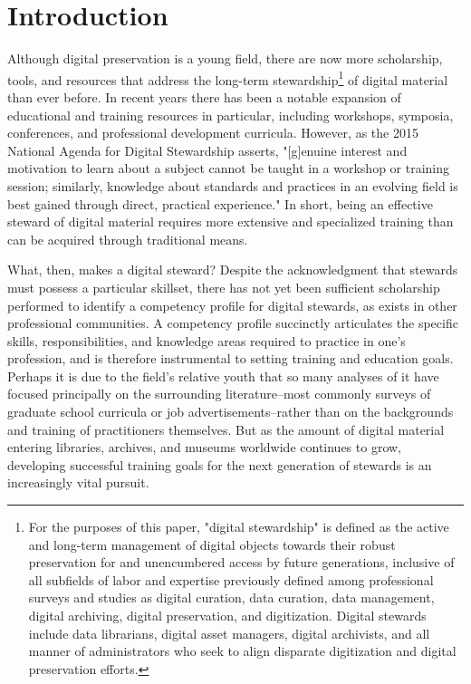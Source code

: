 \documentclass{acm_proc_article-sp}
\begin{document}
\section{Introduction}
Although digital preservation is a young field, there are now more scholarship, tools, and resources that address the long-term stewardship\footnote{For the purposes of this paper, "digital stewardship" is defined as the active and long-term management of digital objects towards their robust preservation for and unencumbered access by future generations, inclusive of all subfields of labor and expertise previously defined among professional surveys and studies as digital curation, data curation, data management, digital archiving, digital preservation, and digitization. Digital stewards include data librarians, digital asset managers, digital archivists, and all manner of administrators who seek to align disparate digitization and digital preservation efforts.} of digital material than ever before. In recent years there has been a notable expansion of educational and training resources in particular, including workshops, symposia, conferences, and professional development curricula. However, as the 2015 National Agenda for Digital Stewardship asserts, "[g]enuine interest and motivation to learn about a subject cannot be taught in a workshop or training session; similarly, knowledge about standards and practices in an evolving field is best gained through direct, practical experience."\cite{1} In short, being an effective steward of digital material requires more extensive and specialized training than can be acquired through traditional means.

What, then, makes a digital steward? Despite the acknowledgment that stewards must possess a particular skillset, there has not yet been sufficient scholarship performed to identify a competency profile for digital stewards, as exists in other professional communities. A competency profile succinctly articulates the specific skills, responsibilities, and knowledge areas required to practice in one's profession, and is therefore instrumental to setting training and education goals. Perhaps it is due to the field's relative youth that so many analyses of it have focused principally on the surrounding literature--most commonly surveys of graduate school curricula or job advertisements--rather than on the backgrounds and training of practitioners themselves. But as the amount of digital material entering libraries, archives, and museums worldwide continues to grow, developing successful training goals for the next generation of stewards is an increasingly vital pursuit.  
\end{document}
